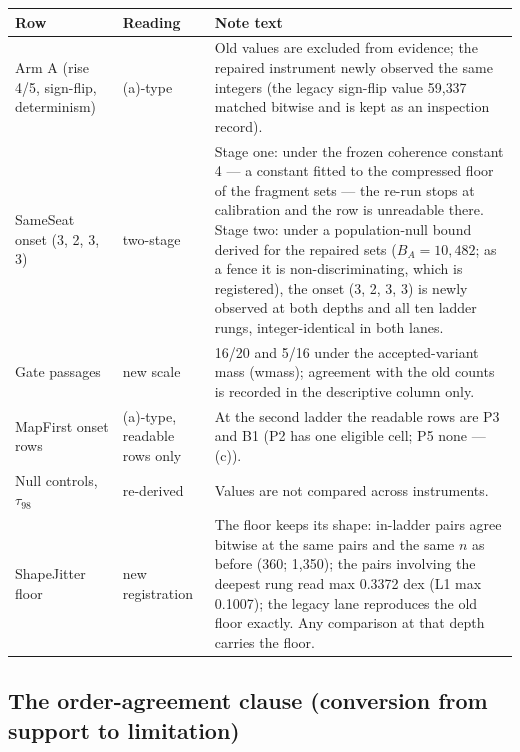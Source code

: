 \documentclass[11pt]{article}
\begin{document}
\begin{center}\small
{}
\label{tab:revision}
\begin{tabular}{@{}p{3.1cm}p{2.4cm}p{8.6cm}@{}}\toprule
Row & Reading & Note text \\ \midrule
Arm A (rise 4/5, sign-flip, determinism) & (a)-type & Old values are excluded from evidence; the repaired instrument newly observed the same integers (the legacy sign-flip value 59{,}337 matched bitwise and is kept as an inspection record). \\
SameSeat onset (3, 2, 3, 3) & two-stage & Stage one: under the frozen coherence constant 4 --- a constant fitted to the compressed floor of the fragment sets --- the re-run stops at calibration and the row is unreadable there. Stage two: under a population-null bound derived for the repaired sets ($B_A = 10{,}482$; as a fence it is non-discriminating, which is registered), the onset (3, 2, 3, 3) is newly observed at both depths and all ten ladder rungs, integer-identical in both lanes. \\
Gate passages & new scale & 16/20 and 5/16 under the accepted-variant mass (wmass); agreement with the old counts is recorded in the descriptive column only. \\
MapFirst onset rows & (a)-type, readable rows only & At the second ladder the readable rows are P3 and B1 (P2 has one eligible cell; P5 none --- (c)). \\
Null controls, $\tau_{98}$ & re-derived & Values are not compared across instruments. \\
ShapeJitter floor & new registration & The floor keeps its shape: in-ladder pairs agree bitwise at the same pairs and the same $n$ as before (360; 1{,}350); the pairs involving the deepest rung read max 0.3372 dex (L1 max 0.1007); the legacy lane reproduces the old floor exactly. Any comparison at that depth carries the floor. \\
\bottomrule\end{tabular}
\end{center}

\subsection*{The order-agreement clause (conversion from support to limitation)}
\end{document}
